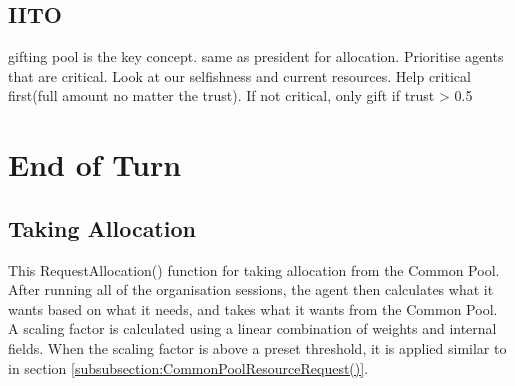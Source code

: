 \subsection{IITO}

gifting pool is the key concept. same as president for allocation. Prioritise agents that are critical. Look at our selfishness and current resources. Help critical first(full amount no matter the trust). If not critical, only gift if trust > 0.5


 

\section{End of Turn}
\subsection{Taking Allocation}
This RequestAllocation() function for taking allocation from the Common Pool. After running all of the organisation sessions, the agent then calculates what it wants based on what it needs, and takes what it wants from the Common Pool. A scaling factor is calculated using a linear combination of weights and internal fields. When the scaling factor is above a preset threshold, it is applied similar to in section \ref{subsubsection:CommonPoolResourceRequest()}.  %

